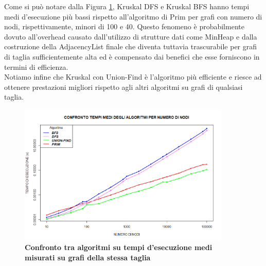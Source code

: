 \documentclass[]{article}
\begin{document}
\begin{flushleft}
Come si può notare dalla Figura \ref{conf_tot}, Kruskal DFS e Kruskal BFS hanno tempi medi d'esecuzione più bassi rispetto all'algoritmo di Prim per grafi con numero di nodi, rispettivamente, minori di 100 e 40. Questo fenomeno è probabilmente dovuto all'overhead causato dall'utilizzo di strutture dati come MinHeap e dalla costruzione della AdjacencyList finale che diventa tuttavia trascurabile per grafi di taglia sufficientemente alta ed è compensato dai benefici che esse forniscono in termini di efficienza.\\
Notiamo infine che Kruskal con Union-Find è l'algoritmo più efficiente e riesce ad ottenere prestazioni migliori rispetto agli altri algoritmi su grafi di qualsiasi taglia.
\begin{figure}[h]
	\centering
	\includegraphics[width=0.9\textwidth,height=\textheight,keepaspectratio]{CONFRONTO_TOTALE.png}
	\caption{\textbf{Confronto tra algoritmi su tempi d'esecuzione medi misurati su grafi della stessa taglia}}
	\label{conf_tot}
\end{figure}







\end{flushleft}
\end{document}
